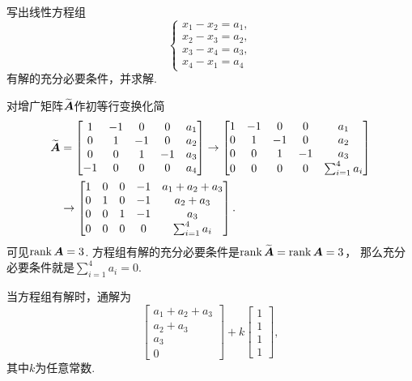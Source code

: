 \begin{example}
写出线性方程组\begin{equation*}
	\left\{ \begin{array}{l}
		x_1 - x_2 = a_1, \\
		x_2 - x_3 = a_2, \\
		x_3 - x_4 = a_3, \\
		x_4 - x_1 = a_4
	\end{array} \right.
\end{equation*}有解的充分必要条件，并求解.
\begin{solution}
对增广矩阵\(\widetilde{\boldsymbol{A}}\)作初等行变换化简
\begin{align*}
	\widetilde{\boldsymbol{A}}
	&= \begin{bmatrix}
		1 & -1 & 0 & 0 & a_1 \\
		0 & 1 & -1 & 0 & a_2 \\
		0 & 0 & 1 & -1 & a_3 \\
		-1 & 0 & 0 & 0 & a_4
	\end{bmatrix} \to \begin{bmatrix}
		1 & -1 & 0 & 0 & a_1 \\
		0 & 1 & -1 & 0 & a_2 \\
		0 & 0 & 1 & -1 & a_3 \\
		0 & 0 & 0 & 0 & \sum_{i=1}^4 a_i
	\end{bmatrix} \\
	&\to \begin{bmatrix}
		1 & 0 & 0 & -1 & a_1 + a_2 + a_3 \\
		0 & 1 & 0 & -1 & a_2 + a_3 \\
		0 & 0 & 1 & -1 & a_3 \\
		0 & 0 & 0 & 0 & \sum_{i=1}^4 a_i
	\end{bmatrix}.
\end{align*}
可见\(\rank\boldsymbol{A} = 3\).
方程组有解的充分必要条件是\(\rank\widetilde{\boldsymbol{A}} = \rank\boldsymbol{A} = 3\)，
那么充分必要条件就是\(\sum_{i=1}^4 a_i = 0\).

当方程组有解时，通解为\begin{equation*}
	\begin{bmatrix}
		a_1 + a_2 + a_3 \\ a_2 + a_3 \\ a_3 \\ 0
	\end{bmatrix}
	+ k \begin{bmatrix}
		1 \\ 1 \\ 1 \\ 1
	\end{bmatrix},
\end{equation*}
其中\(k\)为任意常数.
\end{solution}
\end{example}

